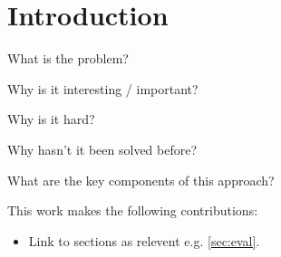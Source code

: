 \section{Introduction}
\label{sec:intro}
What is the problem?

Why is it interesting / important?

Why is it hard?

Why hasn't it been solved before?

What are the key components of this approach?

This work makes the following contributions:
\begin{itemize}
    \item Link to sections as relevent e.g. \autoref{sec:eval}.
\end{itemize}
